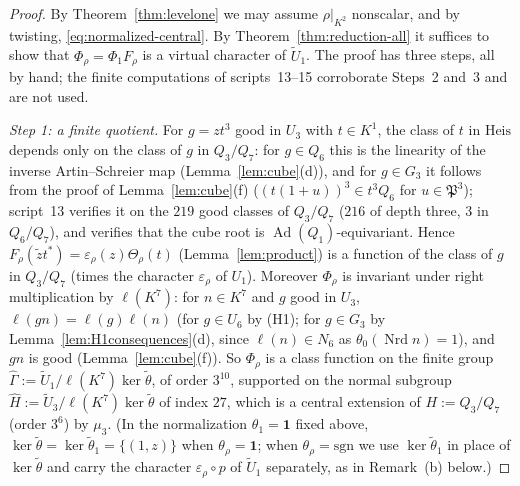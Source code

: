 \documentclass[11pt]{article}
\newcommand{\Nrd}{\operatorname{Nrd}}
\newcommand{\Ad}{\operatorname{Ad}}
\newcommand{\tU}{\widetilde U}
\newcommand{\tth}{\widetilde\theta}
\newcommand{\Pfr}{\mathfrak P}
\theoremstyle{plain}
\theoremstyle{definition}
\begin{document}
\begin{proof}
By Theorem~\ref{thm:levelone} we may assume $\rho|_{K^2}$ nonscalar, and
by twisting, \eqref{eq:normalized-central}.  By
Theorem~\ref{thm:reduction-all} it suffices to show that
$\Phi_\rho=\Phi_1F_\rho$ is a virtual character of $\tU_1$.  The proof
has three steps, all by hand; the finite computations of
scripts~13--15 corroborate Steps~2 and~3 and are not used.

\emph{Step 1: a finite quotient.}  For $g=zt^3$ good in $U_3$ with
$t\in K^1$, the class of $t$ in $\mathrm{Heis}$ depends only on the
class of $g$ in $Q_3/Q_7$: for $g\in Q_6$ this is the linearity of the
inverse Artin--Schreier map (Lemma~\ref{lem:cube}(d)), and for
$g\in G_3$ it follows from the proof of Lemma~\ref{lem:cube}(f)
($(t(1+u))^3\in t^3Q_6$ for $u\in\Pfr^3$); script~13 verifies it on
the $219$ good classes of $Q_3/Q_7$ ($216$ of depth three, $3$ in
$Q_6/Q_7$), and verifies that the cube root is $\Ad(Q_1)$-equivariant.
Hence $F_\rho(\tilde zt^*)=\varepsilon_\rho(z)\Theta_\rho(t)$
(Lemma~\ref{lem:product}) is a function of the class of $g$ in
$Q_3/Q_7$ (times the character $\varepsilon_\rho$ of $U_1$).  Moreover
$\Phi_\rho$ is invariant under right multiplication by $\ell(K^7)$: for
$n\in K^7$ and $g$ good in $U_3$, $\ell(gn)=\ell(g)\ell(n)$ (for
$g\in U_6$ by (H1); for $g\in G_3$ by Lemma~\ref{lem:H1consequences}(d),
since $\ell(n)\in N_6$ as $\theta_0(\Nrd n)=1$), and $gn$ is good
(Lemma~\ref{lem:cube}(f)).  So $\Phi_\rho$ is a class function on the
finite group $\hat\Gamma:=\tU_1/\ell(K^7)\ker\tth$, of order $3^{10}$,
supported on the normal subgroup $\hat H:=\tU_3/\ell(K^7)\ker\tth$ of
index $27$, which is a central extension of $H:=Q_3/Q_7$ (order $3^6$)
by $\mu_3$.  (In the normalization $\theta_1=\mathbf1$ fixed above,
$\ker\tth=\ker\tth_1=\{(1,z)\}$ when $\theta_\rho=\mathbf1$; when
$\theta_\rho=\mathrm{sgn}$ we use $\ker\tth_1$ in place of $\ker\tth$ and
carry the character $\varepsilon_\rho\circ p$ of $\tU_1$ separately, as
in Remark~(b) below.)


\end{proof}
\end{document}
